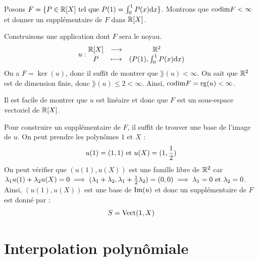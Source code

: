\documentclass[11pt,a4paper]{report}
\begin{document}
\begin{example}
    Posons $F = \{P \in \mathbb{R}[X] \text{ tel que } P(1) = \int_0^1 P(x) \mathrm dx\}$. Montrons que $\mathrm{codim} F < \infty$ et donner un supplémentaire de $F$ dans $\mathbb{R}[X]$.

    Construisons une application dont $F$ sera le noyau.
    $$u : \begin{matrix} \mathbb{R}[X] & \longrightarrow & \mathbb{R}^2 \\ P & \longmapsto & (P(1),\int_0^1 P(x) \mathrm dx) \end{matrix}$$
    On a $F = \ker(u)$, donc il suffit de montrer que $\rang(u) < \infty$. On sait que $\mathbb{R}^2$ est de dimension finie, donc $\rang(u) \leq 2 < \infty$. Ainsi, $\mathrm{codim} F = \mathrm{rg}(u) < \infty$.

    Il est facile de montrer que $u$ est linéaire et donc que $F$ est un sous-espace vectoriel de $\mathbb{R}[X]$.

    Pour construire un supplémentaire de $F$, il suffit de trouver une base de l'image de $u$. On peut prendre les polynômes $1$ et $X$ :
    $$u(1) = (1,1) \text{ et } u(X) = (1,\frac12)$$
    On peut vérifier que $(u(1),u(X))$ est une famille libre de $\mathbb{R}^2$ car $\lambda_1 u(1) + \lambda_2 u(X) = 0 \implies (\lambda_1 + \lambda_2, \lambda_1 + \frac12 \lambda_2) = (0,0) \implies \lambda_1 = 0 \text{ et } \lambda_2 = 0$. Ainsi, $(u(1),u(X))$ est une base de $\mathrm{Im}(u)$ et donc un supplémentaire de $F$ est donné par :
    $$S = \mathrm{Vect}(1,X)$$
\end{example}

\section{Interpolation polynômiale}
\end{document}
